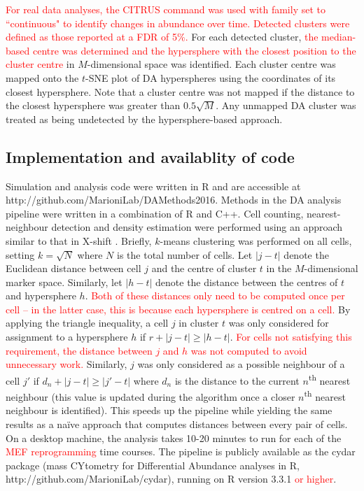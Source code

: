 \documentclass{article}
\newcommand\revised[1]{\textcolor{red}{#1}}
\begin{document}
\revised{For real data analyses, the CITRUS command was used with family set to ``continuous" to identify changes in abundance over time. 
    Detected clusters were defined as those reported at a FDR of 5\%.}
    For each detected cluster, \revised{the median-based centre was determined and the hypersphere with the closest position to the cluster centre} in $M$-dimensional space was identified.
Each cluster centre was mapped onto the $t$-SNE plot of DA hyperspheres using the coordinates of its closest hypersphere.
Note that a cluster centre was not mapped if the distance to the closest hypersphere was greater than $0.5\sqrt{M}$.
Any unmapped DA cluster was treated as being undetected by the hypersphere-based approach.

\subsection{Implementation and availablity of code}
Simulation and analysis code were written in R and are accessible at {http://\-github.com/\-MarioniLab/\-DAMethods2016}.
Methods in the DA analysis pipeline were written in a combination of R and C++.
Cell counting, nearest-neighbour detection and density estimation were performed using an approach similar to that in X-shift \cite{samusik2016automated}.
Briefly, $k$-means clustering was performed on all cells, setting $k=\sqrt{N}$ where $N$ is the total number of cells.
Let $|j-t|$ denote the Euclidean distance between cell $j$ and the centre of cluster $t$ in the $M$-dimensional marker space.
Similarly, let $|h-t|$ denote the distance between the centres of $t$ and hypersphere $h$. 
\revised{Both of these distances only need to be computed once per cell -- in the latter case, this is because each hypersphere is centred on a cell.}
By applying the triangle inequality, a cell $j$ in cluster $t$ was only considered for assignment to a hypersphere $h$ if $r + |j-t| \ge |h-t|$.
\revised{For cells not satisfying this requirement, the distance between $j$ and $h$ was not computed to avoid unnecessary work.}
Similarly, $j$ was only considered as a possible neighbour of a cell $j'$ if $d_n + |j-t| \ge |j'-t|$ where $d_n$ is the distance to the current $n$\textsuperscript{th} nearest neighbour (this value is updated during the algorithm once a closer $n$\textsuperscript{th} nearest neighbour is identified).
This speeds up the pipeline while yielding the same results as a na\"ive approach that computes distances between every pair of cells.
On a desktop machine, the analysis takes 10-20 minutes to run for each of the \revised{MEF reprogramming} time courses.
The pipeline is publicly available as the cydar package (mass CYtometry for Differential Abundance analyses in R, http://\-github.com/\-MarioniLab/\-cydar), running on R version 3.3.1 \revised{or higher}.
\end{document}
